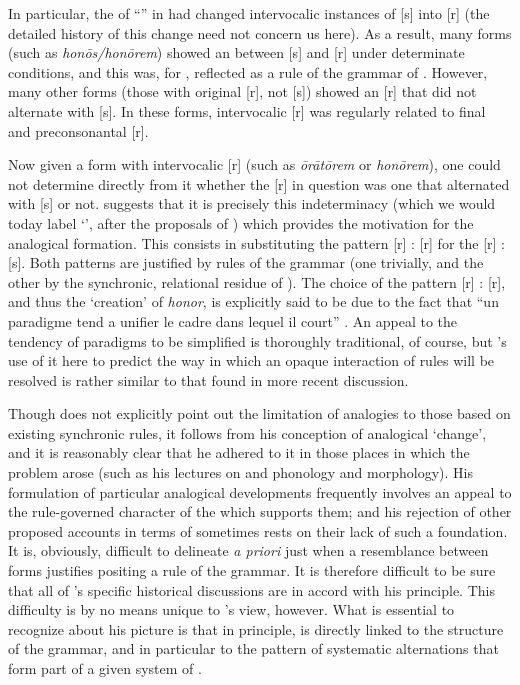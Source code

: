 In particular, the  of ``'' in  had
changed intervocalic instances of [s] into [r] (the detailed history
of this change need not concern us here). As a result, many forms
(such as \emph{honōs/honōrem}) showed an  between [s] and [r]
under determinate conditions, and this was, for {\Saussure}, reflected as
a rule of the grammar of . However, many other forms (those with
original [r], not [s]) showed an [r] that did not alternate with
[s]. In these forms, intervocalic [r] was regularly related to final
and preconsonantal [r].

Now given a form with intervocalic [r] (such as \emph{ōrātōrem} or
\emph{honōrem}), one could not determine directly from it whether the
[r] in question was one that alternated with [s] or not. {\Saussure}
suggests that it is precisely this indeterminacy (which we would today
label `', after the proposals of
\citealt{kiparsky:3dimensions}) which provides the motivation for the
analogical formation. This consists in substituting the 
pattern [r] : [r] for the  [r] : [s]. Both patterns are
justified by rules of the grammar (one trivially, and the other by the
synchronic, relational residue of ). The choice of the
pattern [r] : [r], and thus the `creation' of \emph{honor}, is
explicitly said to be due to the fact that ``un paradigme tend a
unifier le cadre dans lequel il court''
\citep[56]{reichler-beguelin80:saussure-grec-et-latin}. An appeal to
the tendency of paradigms to be simplified is thoroughly traditional,
of course, but {\Saussure}'s use of it here to predict the way in which
an opaque interaction of rules will be resolved is rather similar to
that found in more recent discussion.

Though {\Saussure} does not explicitly point out the limitation of
analogies to those based on existing synchronic rules, it follows from
his conception of analogical `change', and it is reasonably clear that
he adhered to it in those places in which the problem arose (such as
his lectures on  and  phonology and morphology). His
formulation of particular analogical developments frequently involves
an appeal to the rule-governed character of the  which
supports them; and his rejection of other proposed accounts in terms
of  sometimes rests on their lack of such a foundation. It is,
obviously, difficult to delineate \emph{a priori} just when a resemblance
between forms justifies positing a rule of the grammar. It is
therefore difficult to be sure that all of {\Saussure}'s specific
historical discussions are in accord with his principle. This
difficulty is by no means unique to {\Saussure}'s view, however. What is
essential to recognize about his picture is that in principle, 
is directly linked to the structure of the grammar, and in particular
to the pattern of systematic alternations that form part of a given
system of \emph{}.

